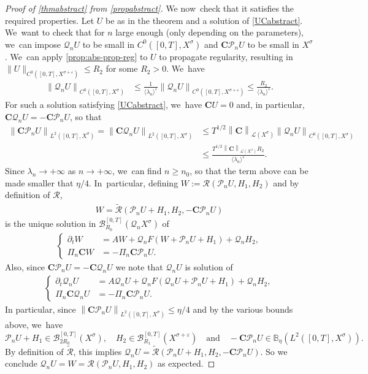 \documentclass[11pt]{article}
\newcommand{\quand}{\quad\text{and}\quad}
\theoremstyle{definition}
\let\mc\mathcal
\let\veps\varepsilon
\newcommand{\B}{\mc{B}}
\newcommand{\Q}{\mathcal{Q}}
\renewcommand{\P}{\mathcal{P}}
\newcommand{\bC}{\boldsymbol{C}}
\providecommand{\norm}[1]{\lVert#1\rVert}
\providecommand{\inn}[1]{\langle#1\rangle}
\newcommand\nor[2]{\left\|#1\right\|_{#2}}
\begin{document}
\begin{proof}[Proof of \cref{thmabstract} from \cref{propabstract}]
We now~check that it satisfies the required properties. Let $U$ be as in the theorem and a solution of \eqref{UCabstract}. We~want to check that for $n$ large enough (only depending on the parameters), we~can impose $\Q_n U$ to be small in $C^{0}([0,T],X^{\sigma})$ and $\bC \P_n U$ to be small in $X^{\sigma}$. We~can apply \cref{prop:abs-prop-reg} to $U$ to propagate regularity, resulting in $\norm{U}_{C^0([0, T], X^{\sigma+\veps})}\leq R_{2}$ for some $R_{2}>0$. We~have
\begin{align}
\label{unifboundU}
\nor{ \Q_n U}{C^{0}([0,T],X^{\sigma})} &\leq \frac{1}{\inn{\lambda_n}^{\veps}} \nor{ \Q_n U}{C^{0}([0,T],X^{\sigma+\veps})}\leq \frac{R_{2}}{\inn{\lambda_n}^{\veps}} .
\end{align}
For such a solution satisfying \eqref{UCabstract}, we~have $\bC U=0$ and, in particular, $\bC \Q_n U=-\bC \P_n U$, so that
\begin{align*}
\nor{\bC \P_n U}{L^{2}([0,T],X^{\sigma})}=\nor{\bC \Q_n U}{L^{2}([0,T],X^{\sigma})}&\leq T^{1/2}\nor{\bC}{\mc{L}(X^\sigma)}\nor{ \Q_n U}{C^{0}([0,T],X^{\sigma})}\\
&\leq \frac{T^{1/2}\nor{\bC}{\mc{L}(X^\sigma)}R_{2}}{\inn{\lambda_n}^{\veps}} .
\end{align*}
Since $\lambda_n\to +\infty$ as $n\to +\infty$, we~can find $n\geq n_0$, so that the term above can be made smaller that $\eta/4$. In~particular, defining $W:= \mathcal{R}(\P_{n}U,H_{1},H_{2})$ and by definition of $\mathcal{R}$,
\begin{align*}
W= \mathcal{\widetilde{R}}(\P_{n}U+H_{1},H_{2},- \bC \P_{n}U)
\end{align*}
is the unique solution in $\B_{R_{0}}^{[0,T]}(\Q_n X^{\sigma})$ of
\begin{align*}
\left\{\begin{array}{rl}
\partial_t W&=AW+\Q_n F(W+\P_{n}U+H_{1})+\Q_{n}H_{2}, \\[3pt]
\Pi_n\bC W &=-\Pi_n \bC \P_{n}U.
\end{array}\right.
\end{align*}
Also, since $\bC \P_{n}U=- \bC \Q_{n}U $ we note that $\Q_n U$ is solution of
\begin{align*}
\left\{\begin{array}{rl}
\partial_t \Q_n U&=A\Q_n U+\Q_n F(\Q_n U+\P_n U+H_{1})+\Q_{n}H_{2}, \\[3pt]
\Pi_n\bC \Q_n U &=-\Pi_n \bC \P_{n}U.
\end{array}\right.
\end{align*}
In particular, since $ \nor{\bC \P_n U}{L^{2}([0,T],X^{\sigma})}\leq \eta/4$ and by the various bounds above, we~have
\[
\P_n U+H_{1}\in \B_{2R_{0}}^{[0,T]}(X^{\sigma}),\quad H_{2}\in \B_{R_{1}}^{[0,T]}(X^{\sigma+\veps})\quand-\bC \P_{n}U\in \mathbb{B}_{\eta}(L^2([0, T], X^{\sigma})).
\]
By definition of $\mathcal{\widetilde{R}}$, this implies $\Q_n U= \mathcal{\widetilde{R}}(\P_n U+H_{1},H_{2},- \bC \P_{n}U)$. So we conclude $\Q_{n}U=W=\mathcal{R}(\P_{n}U,H_{1},H_{2})$ as expected.


\end{proof}
\end{document}
